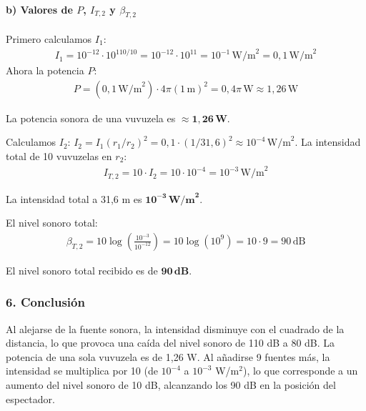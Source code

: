 \paragraph*{b) Valores de $P$, $I_{T,2}$ y $\beta_{T,2}$}
Primero calculamos $I_1$:
\begin{gather}
    I_1 = 10^{-12} \cdot 10^{110/10} = 10^{-12} \cdot 10^{11} = 10^{-1} \, \text{W/m}^2 = 0,1 \, \text{W/m}^2
\end{gather}
Ahora la potencia $P$:
\begin{gather}
    P = (0,1 \, \text{W/m}^2) \cdot 4\pi (1 \, \text{m})^2 = 0,4\pi \, \text{W} \approx 1,26 \, \text{W}
\end{gather}
\begin{cajaresultado}
    La potencia sonora de una vuvuzela es $\boldsymbol{\approx 1,26 \, \textbf{W}}$.
\end{cajaresultado}
Calculamos $I_2$: $I_2 = I_1 (r_1/r_2)^2 = 0,1 \cdot (1/31,6)^2 \approx 10^{-4} \, \text{W/m}^2$.
La intensidad total de 10 vuvuzelas en $r_2$:
\begin{gather}
    I_{T,2} = 10 \cdot I_2 = 10 \cdot 10^{-4} = 10^{-3} \, \text{W/m}^2
\end{gather}
\begin{cajaresultado}
    La intensidad total a 31,6 m es $\boldsymbol{10^{-3} \, \textbf{W/m}^2}$.
\end{cajaresultado}
El nivel sonoro total:
\begin{gather}
    \beta_{T,2} = 10 \log\left(\frac{10^{-3}}{10^{-12}}\right) = 10 \log(10^9) = 10 \cdot 9 = 90 \, \text{dB}
\end{gather}
\begin{cajaresultado}
    El nivel sonoro total recibido es de $\boldsymbol{90 \, \textbf{dB}}$.
\end{cajaresultado}

\subsubsection*{6. Conclusión}
\begin{cajaconclusion}
    Al alejarse de la fuente sonora, la intensidad disminuye con el cuadrado de la distancia, lo que provoca una caída del nivel sonoro de 110 dB a 80 dB. La potencia de una sola vuvuzela es de 1,26 W. Al añadirse 9 fuentes más, la intensidad se multiplica por 10 (de $10^{-4}$ a $10^{-3}$ W/m$^2$), lo que corresponde a un aumento del nivel sonoro de 10 dB, alcanzando los 90 dB en la posición del espectador.
\end{cajaconclusion}


